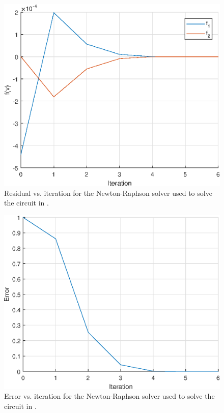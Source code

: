 \documentclass[journal,hidelinks]{IEEEtran}
\begin{document}
\begin{figure}[!htb]
  \centering
  \includegraphics[width=\columnwidth]{question-3/residual.eps}
  \caption{Residual vs. iteration for the Newton-Raphson solver used to solve the circuit in .}
  \label{fig:q3-residual}
\end{figure}

\begin{figure}[!htb]
  \centering
  \includegraphics[width=\columnwidth]{question-3/error.eps}
  \caption{Error vs. iteration for the Newton-Raphson solver used to solve the circuit in .}
  \label{fig:q3-error}
\end{figure}
\end{document}
